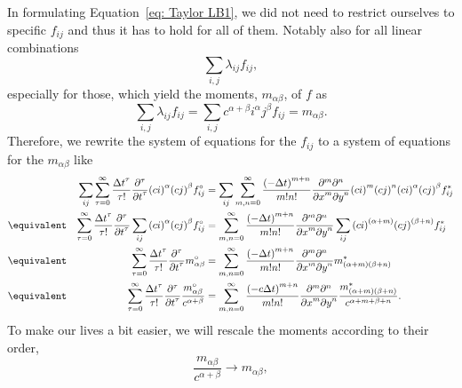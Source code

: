 In formulating Equation~\eqref{eq: Taylor LB1}, we did not need to restrict ourselves to specific $f_{ij}$ and thus it has to hold for all of them. Notably also for all linear combinations
\begin{equation*}
  \sum_{i,j}\lambda_{ij} f_{ij},
\end{equation*}
especially for those, which yield the moments, $m_{\alpha\beta} $, of $f$ as
\begin{equation}
  \sum_{i,j}\lambda_{ij} f_{ij} = \sum_{i,j}c^{\alpha + \beta}i^\alpha j^\beta f_{ij}=m_{\alpha\beta}.
\end{equation}
Therefore, we rewrite the system of equations for the $f_{ij}$ to a system of equations for the $m_{\alpha\beta}$ like
\begin{align}
    \nonumber
    & & \sum_{ij} \sum_{\tau = 0}^\infty \frac{{\Delta t}^\tau }{\tau!} \frac{\partial^\tau}{{\partial t}^\tau} {(ci)}^\alpha {(cj)}^\beta f_{ij}^{\circ}
    &=
    \sum_{ij}\sum_{m,n = 0}^\infty \frac{{(-\Delta t)}^{m+n}} {m!n!} \frac{\partial^m \partial^n}{ {\partial x}^m{\partial y}^n} {(ci)}^m {(cj)}^n {(ci)}^\alpha {(cj)}^\beta f^*_{ij}
    \\ \nonumber &\equivalent &
    \sum_{\tau = 0}^\infty \frac{{\Delta t}^\tau }{\tau!} \frac{\partial^\tau}{{\partial t}^\tau} \sum_{ij}{(ci)}^\alpha {(cj)}^\beta f_{ij}^{\circ}
    &=
    \sum_{m,n = 0}^\infty \frac{{(-\Delta t)}^{m+n}} {m!n!} \frac{\partial^m \partial^n}{ {\partial x}^m{\partial y}^n}\sum_{ij}{(ci)}^{(\alpha+m)} {(cj)}^{(\beta+n)} f^*_{ij}
    \\ \nonumber &\equivalent &
     \sum_{\tau = 0}^\infty \frac{{\Delta t}^\tau }{\tau!} \frac{\partial^\tau}{{\partial t}^\tau} m_{\alpha\beta}^{\circ} &=
    \sum_{m,n = 0}^\infty \frac{{(-\Delta t)}^{m+n}} {m!n!} \frac{\partial^m \partial^n}{ {\partial x}^m{\partial y}^n} m^*_{(\alpha + m)(\beta + n)}
     \\   &\equivalent &
     \sum_{\tau = 0}^\infty \frac{{\Delta t}^\tau }{\tau!} \frac{\partial^\tau}{{\partial t}^\tau} \frac{m_{\alpha\beta}^{\circ}}{c^{\alpha + \beta}} &=
    \sum_{m,n = 0}^\infty \frac{{(- c\Delta t)}^{m+n}} {m!n!} \frac{\partial^m \partial^n}{ {\partial x}^m{\partial y}^n} \frac{m^*_{(\alpha + m)(\beta + n)}}{c^{\alpha + m + \beta + n}}.
\end{align}
To make our lives a bit easier, we will rescale the moments according to their order,
\begin{equation}
  \label{eq: rescaling the moments}
  \frac{m_{\alpha\beta}}{c^{\alpha + \beta}} \rightarrow m_{\alpha\beta},
\end{equation}
